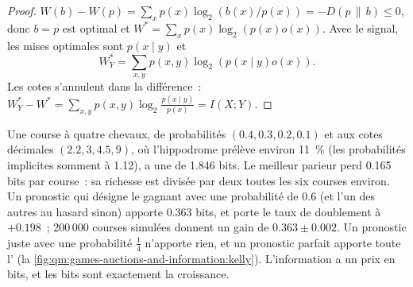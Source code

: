 \begin{proof}
$W(b) - W(p) = \sum_xp(x)\log_2(b(x)/p(x)) = -D(p\,\|\,b) \le 0$, donc $b = p$ est optimal et $W^* = \sum_xp(x)\log_2(p(x)o(x))$. Avec le signal, les mises optimales sont $p(x \mid y)$ et
\[W^*_Y = \sum_{x,y}p(x, y)\log_2(p(x \mid y)o(x)).\] Les cotes s'annulent dans la différence~: $W^*_Y - W^* = \sum_{x,y}p(x, y)\log_2\frac{p(x \mid y)}{p(x)} = I(X; Y)$.
\end{proof}

Une course à quatre chevaux, de probabilités $(0.4, 0.3, 0.2, 0.1)$ et aux cotes décimales $(2.2, 3, 4.5, 9)$, où l'hippodrome prélève environ 11~\% (les probabilités implicites somment à 1.12), a une  de 1.846 bits. Le meilleur parieur
perd 0.165 bits par course~: sa richesse est divisée par deux toutes les six courses environ. Un pronostic qui désigne le gagnant avec une probabilité de 0.6 (et l'un des autres au hasard sinon) apporte 0.363 bits, et porte le taux de doublement à $+0.198$~;
200\,000 courses simulées donnent un gain de $0.363 \pm 0.002$. Un pronostic juste avec une probabilité $\frac14$ n'apporte rien, et un pronostic parfait apporte toute l' (la \cref{fig:qm:games-auctions-and-information:kelly}).
L'information a un prix en bits, et les bits sont exactement la croissance.

\begin{omfigure}

\label{fig:qm:games-auctions-and-information:kelly}
\end{omfigure}

